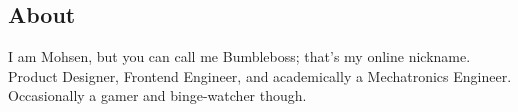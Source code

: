 \documentclass[9pt]{extarticle}
\begin{document}
  \setlength{\columnsep}{3em}
  
  \begin{paracol}{2}
    \begin{leftcolumn}
      
      
    \end{leftcolumn}
    
    \begin{rightcolumn}
      \sloppy\RaggedRight
      \section*{About}
      I am Mohsen, but you can call me \mbox{Bumbleboss}; that's my online nickname.
      Product Designer, Frontend Engineer, and academically a Mechatronics Engineer.
      Occasionally a gamer and binge-watcher though.
      
      
    \end{rightcolumn}
  \end{paracol}
\end{document}
